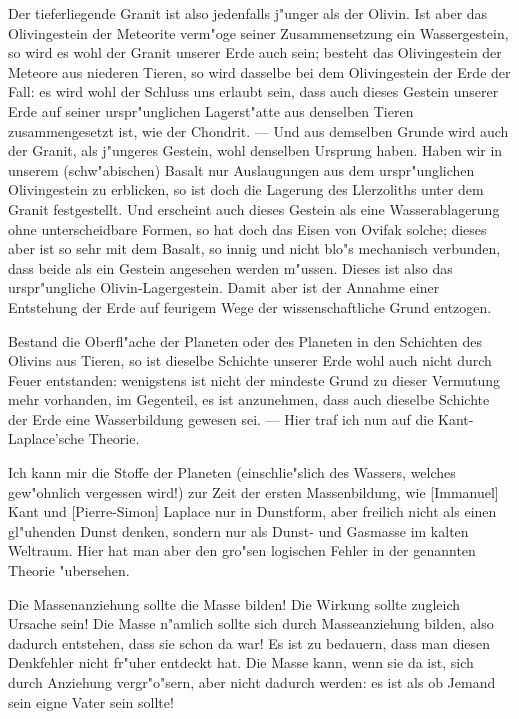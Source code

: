 \documentclass[a4paper, 11pt, oneside]{article}
\begin{document}
Der tieferliegende Granit ist also jedenfalls j"unger als der Olivin. Ist aber das Olivingestein der Meteorite verm"oge seiner Zusammensetzung ein Wassergestein, so wird es wohl der Granit unserer Erde auch sein; besteht das Olivingestein der Meteore aus niederen Tieren, so wird dasselbe bei dem Olivingestein der Erde der Fall: es wird wohl der Schluss uns erlaubt sein, dass auch dieses Gestein unserer Erde auf seiner urspr"unglichen Lagerst"atte aus denselben Tieren zusammengesetzt ist, wie der Chondrit. --- Und aus demselben Grunde wird auch der Granit, als j"ungeres Gestein, wohl denselben Ursprung haben. Haben wir in unserem (schw"abischen) Basalt nur Auslaugungen aus dem urspr"unglichen Olivingestein zu erblicken, so ist doch die Lagerung des Llerzoliths unter dem Granit festgestellt. Und erscheint auch dieses Gestein als eine Wasserablagerung ohne unterscheidbare Formen, so hat doch das Eisen von Ovifak solche; dieses aber ist so sehr mit dem Basalt, so innig und nicht blo"s mechanisch verbunden, dass beide als ein Gestein angesehen werden m"ussen. Dieses ist also das urspr"ungliche Olivin-Lagergestein. Damit aber ist der Annahme einer Entstehung der Erde auf feurigem Wege der wissenschaftliche Grund entzogen.

Bestand die Oberfl"ache der Planeten oder des Planeten in den Schichten des Olivins aus Tieren, so ist dieselbe Schichte unserer Erde wohl auch nicht durch Feuer entstanden: wenigstens ist nicht der mindeste Grund zu dieser Vermutung mehr vorhanden, im Gegenteil, es ist anzunehmen, dass auch dieselbe Schichte der Erde eine Wasserbildung gewesen sei. --- Hier traf ich nun auf die Kant-Laplace'sche Theorie.

Ich kann mir die Stoffe der Planeten (einschlie"slich des Wassers, welches gew"ohnlich vergessen wird!) zur Zeit der ersten Massenbildung, wie [Immanuel] Kant und [Pierre-Simon] Laplace nur in Dunstform, aber freilich nicht als einen gl"uhenden Dunst denken, sondern nur als Dunst- und Gasmasse im kalten Weltraum. Hier hat man aber den gro"sen logischen Fehler in der genannten Theorie "ubersehen.

Die Massenanziehung sollte die Masse bilden! Die Wirkung sollte zugleich Ursache sein! Die Masse n"amlich sollte sich durch Masseanziehung bilden, also dadurch entstehen, dass sie schon da war! Es ist zu bedauern, dass man diesen Denkfehler nicht fr"uher entdeckt hat. Die Masse kann, wenn sie da ist, sich durch Anziehung vergr"o"sern, aber nicht dadurch werden: es ist als ob Jemand sein eigne Vater sein sollte!
\end{document}
